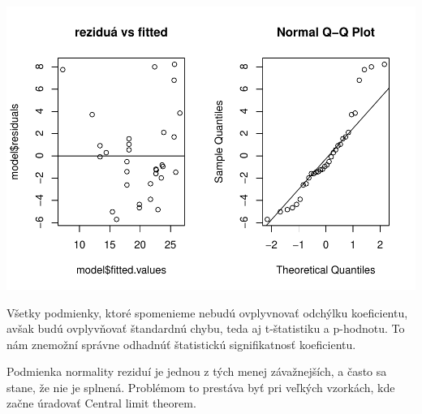 \begin{Shaded}
\begin{Highlighting}[]

\NormalTok{(}\NormalTok{(}\NormalTok{, }\NormalTok{))}

\OperatorTok{$}\OperatorTok{$} \NormalTok{)}
\NormalTok{(}\NormalTok{, }\NormalTok{)}

\OperatorTok{$}
\OperatorTok{$}
\end{Highlighting}
\end{Shaded}

\includegraphics{test_files/figure-latex/unnamed-chunk-50-1.pdf}

Všetky podmienky, ktoré spomenieme nebudú ovplyvnovať odchýlku
koeficientu, avšak budú ovplyvňovať štandardnú chybu, teda aj
t-štatistiku a p-hodnotu. To nám znemožní správne odhadnúť štatistickú
signifikatnosť koeficientu.

Podmienka normality reziduí je jednou z tých menej závažnejších, a často
sa stane, že nie je splnená. Problémom to prestáva byť pri veľkých
vzorkách, kde začne úradovať Central limit theorem.


